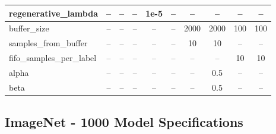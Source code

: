 \documentclass{article}
\begin{document}
\begin{minipage}{\columnwidth}
\begin{tabular}{lccccccccc}
regenerative\_lambda& --   & --    & --   & 1e-5 & --  & --   & --   & --   & --   \\
\midrule
buffer\_size        & --   & --    & --   & --   & --   & 2000 & 2000 & 100  & 100  \\
samples\_from\_buffer & -- & --    & --   & --   & --   & 10   & 10   & --   & --   \\
fifo\_samples\_per\_label & -- & -- & --  & --   & --   & --   & --   & 10   & 10   \\
\midrule
alpha               & --   & --    & --   & --   & --   & --   & 0.5  & --   & --   \\
beta                & --   & --    & --   & --   & --   & --   & 0.5  & --   & --   \\
\bottomrule
\end{tabular}

\caption{Tiny ImageNet model-specific hyperparameters for all methods.}
\label{tab:cifar_model_specs}

\end{minipage}



\subsection{ImageNet - 1000 Model Specifications}
\label{sec:cifar_model_specs}
\end{document}
